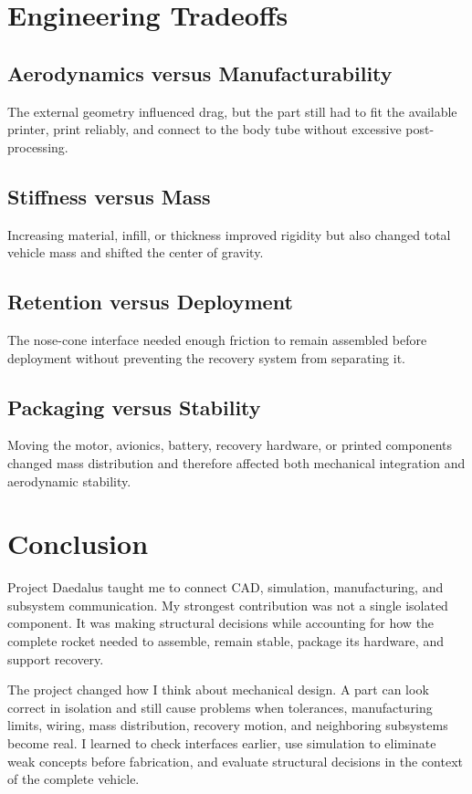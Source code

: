 \documentclass[11pt]{article}
\begin{document}
\section{Engineering Tradeoffs}
\subsection{Aerodynamics versus Manufacturability}
The external geometry influenced drag, but the part still had to fit the available printer, print reliably, and connect to the body tube without excessive post-processing.

\subsection{Stiffness versus Mass}
Increasing material, infill, or thickness improved rigidity but also changed total vehicle mass and shifted the center of gravity.

\subsection{Retention versus Deployment}
The nose-cone interface needed enough friction to remain assembled before deployment without preventing the recovery system from separating it.

\subsection{Packaging versus Stability}
Moving the motor, avionics, battery, recovery hardware, or printed components changed mass distribution and therefore affected both mechanical integration and aerodynamic stability.

\section{Conclusion}
Project Daedalus taught me to connect CAD, simulation, manufacturing, and subsystem communication. My strongest contribution was not a single isolated component. It was making structural decisions while accounting for how the complete rocket needed to assemble, remain stable, package its hardware, and support recovery.

The project changed how I think about mechanical design. A part can look correct in isolation and still cause problems when tolerances, manufacturing limits, wiring, mass distribution, recovery motion, and neighboring subsystems become real. I learned to check interfaces earlier, use simulation to eliminate weak concepts before fabrication, and evaluate structural decisions in the context of the complete vehicle.
\end{document}
